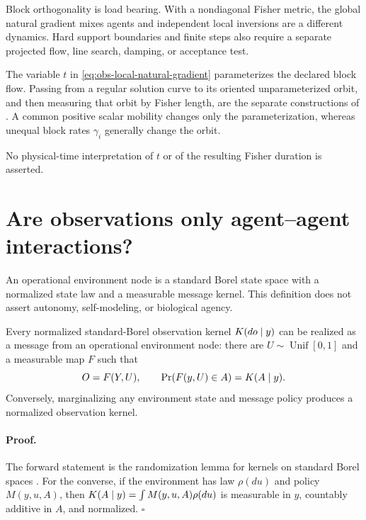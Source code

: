 Block orthogonality is load bearing.  With a nondiagonal Fisher metric, the
global natural gradient mixes agents and independent local inversions are a
different dynamics.  Hard support boundaries and finite steps also require a
separate projected flow, line search, damping, or acceptance test.

The variable \(t\) in \eqref{eq:obs-local-natural-gradient} parameterizes the
declared block flow.  Passing from a regular solution curve to its oriented
unparameterized orbit, and then measuring that orbit by Fisher length, are the
separate constructions of
.  A common
positive scalar mobility changes only the parameterization, whereas unequal
block rates \(\gamma_i\) generally change the orbit.  

No physical-time interpretation of \(t\) or of the resulting Fisher duration
is asserted.  

\section{Are observations only agent--agent interactions?}
\label{sec:local-observation-equivalence}

An operational environment node is a standard Borel state space with a
normalized state law and a measurable message kernel.  This definition does
not assert autonomy, self-modeling, or biological agency.  

Every normalized standard-Borel observation kernel $K(do\mid y)$ can be
realized as a message from an operational environment node: there are
$U\sim\operatorname{Unif}[0,1]$ and a measurable map $F$ such that
\begin{equation}
O=F(Y,U),
\qquad
\Pr(F(y,U)\in A)=K(A\mid y).
\label{eq:obs-randomization}
\end{equation}
Conversely, marginalizing any environment state and message policy produces a
normalized observation kernel.  

\paragraph{Proof.}
The forward statement is the randomization lemma for kernels on standard
Borel spaces \citep{Kallenberg2021}.  For the converse, if the environment has
law $\rho(du)$ and policy $M(y,u,A)$, then
$K(A\mid y)=\int M(y,u,A)\rho(du)$ is measurable in $y$, countably additive
in $A$, and normalized.  $\square$

